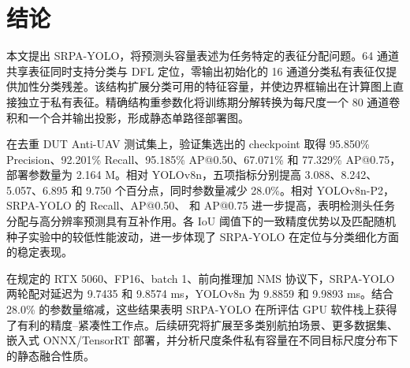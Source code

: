 \section{结论}

本文提出 SRPA-YOLO，将预测头容量表述为任务特定的表征分配问题。64 通道共享表征同时支持分类与 DFL 定位，零输出初始化的 16 通道分类私有表征仅提供加性分类残差。该结构扩展分类可用的特征容量，并使边界框输出在计算图上直接独立于私有表征。精确结构重参数化将训练期分解转换为每尺度一个 80 通道卷积和一个合并输出投影，形成静态单路径部署图。

在去重 DUT Anti-UAV 测试集上，验证集选出的 checkpoint 取得 95.850\% Precision、92.201\% Recall、95.185\% AP@0.50、67.071\% \mapall{} 和 77.329\% AP@0.75，部署参数量为 2.164 M。相对 YOLOv8n，五项指标分别提高 3.088、8.242、5.057、6.895 和 9.750 个百分点，同时参数量减少 28.0\%。相对 YOLOv8n-P2，SRPA-YOLO 的 Recall、AP@0.50、\mapall{} 和 AP@0.75 进一步提高，表明检测头任务分配与高分辨率预测具有互补作用。各 IoU 阈值下的一致精度优势以及匹配随机种子实验中的较低性能波动，进一步体现了 SRPA-YOLO 在定位与分类细化方面的稳定表现。

在规定的 RTX 5060、FP16、batch 1、前向推理加 NMS 协议下，SRPA-YOLO 两轮配对延迟为 9.7435 和 9.8574 ms，YOLOv8n 为 9.8859 和 9.9893 ms。结合 28.0\% 的参数量缩减，这些结果表明 SRPA-YOLO 在所评估 GPU 软件栈上获得了有利的精度--紧凑性工作点。后续研究将扩展至多类别航拍场景、更多数据集、嵌入式 ONNX/TensorRT 部署，并分析尺度条件私有容量在不同目标尺度分布下的静态融合性质。
